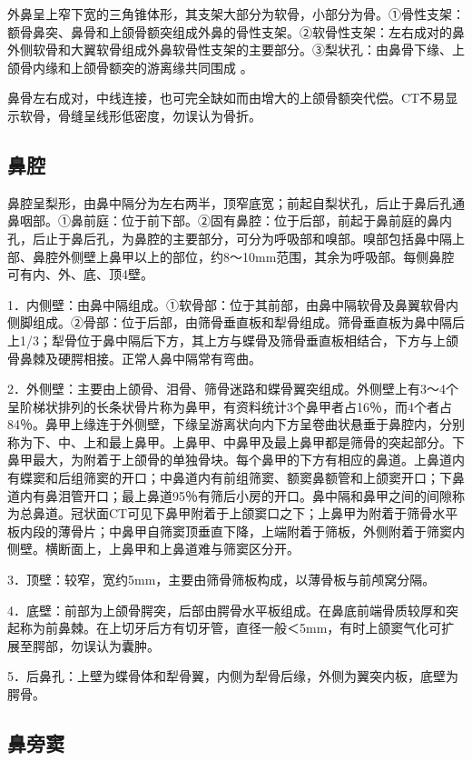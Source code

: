 外鼻呈上窄下宽的三角锥体形，其支架大部分为软骨，小部分为骨。①骨性支架：额骨鼻突、鼻骨和上颌骨额突组成外鼻的骨性支架。②软骨性支架：左右成对的鼻外侧软骨和大翼软骨组成外鼻软骨性支架的主要部分。③梨状孔：由鼻骨下缘、上颌骨内缘和上颌骨额突的游离缘共同围成
。

鼻骨左右成对，中线连接，也可完全缺如而由增大的上颌骨额突代偿。CT不易显示软骨，骨缝呈线形低密度，勿误认为骨折。

\subsection{鼻腔}

鼻腔呈梨形，由鼻中隔分为左右两半，顶窄底宽；前起自梨状孔，后止于鼻后孔通鼻咽部。①鼻前庭：位于前下部。②固有鼻腔：位于后部，前起于鼻前庭的鼻内孔，后止于鼻后孔，为鼻腔的主要部分，可分为呼吸部和嗅部。嗅部包括鼻中隔上部、鼻腔外侧壁上鼻甲以上的部位，约8～10mm范围，其余为呼吸部。每侧鼻腔可有内、外、底、顶4壁。

1．内侧壁：由鼻中隔组成。①软骨部：位于其前部，由鼻中隔软骨及鼻翼软骨内侧脚组成。②骨部：位于后部，由筛骨垂直板和犁骨组成。筛骨垂直板为鼻中隔后上1/3；犁骨位于鼻中隔后下方，其上方与蝶骨及筛骨垂直板相结合，下方与上颌骨鼻棘及硬腭相接。正常人鼻中隔常有弯曲。

2．外侧壁：主要由上颌骨、泪骨、筛骨迷路和蝶骨翼突组成。外侧壁上有3～4个呈阶梯状排列的长条状骨片称为鼻甲，有资料统计3个鼻甲者占16％，而4个者占84％。鼻甲上缘连于外侧壁，下缘呈游离状向内下方呈卷曲状悬垂于鼻腔内，分别称为下、中、上和最上鼻甲。上鼻甲、中鼻甲及最上鼻甲都是筛骨的突起部分。下鼻甲最大，为附着于上颌骨的单独骨块。每个鼻甲的下方有相应的鼻道。上鼻道内有蝶窦和后组筛窦的开口；中鼻道内有前组筛窦、额窦鼻额管和上颌窦开口；下鼻道内有鼻泪管开口；最上鼻道95％有筛后小房的开口。鼻中隔和鼻甲之间的间隙称为总鼻道。冠状面CT可见下鼻甲附着于上颌窦口之下；上鼻甲为附着于筛骨水平板内段的薄骨片；中鼻甲自筛窦顶垂直下降，上端附着于筛板，外侧附着于筛窦内侧壁。横断面上，上鼻甲和上鼻道难与筛窦区分开。

3．顶壁：较窄，宽约5mm，主要由筛骨筛板构成，以薄骨板与前颅窝分隔。

4．底壁：前部为上颌骨腭突，后部由腭骨水平板组成。在鼻底前端骨质较厚和突起称为前鼻棘。在上切牙后方有切牙管，直径一般＜5mm，有时上颌窦气化可扩展至腭部，勿误认为囊肿。

5．后鼻孔：上壁为蝶骨体和犁骨翼，内侧为犁骨后缘，外侧为翼突内板，底壁为腭骨。

\subsection{鼻旁窦}

